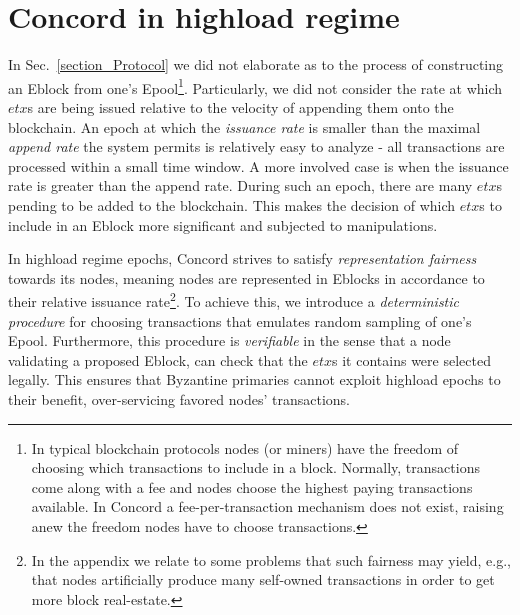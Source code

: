 \section{Concord in highload regime}
In Sec.~\ref{section_Protocol} we did not elaborate as to the process of constructing an Eblock from one's Epool\footnote{In typical blockchain protocols nodes (or miners) have the freedom of choosing which transactions to include in a block. Normally, transactions come along with a fee and nodes choose the highest paying transactions available. In Concord a fee-per-transaction mechanism does not exist, raising anew the freedom nodes have to choose transactions.}. Particularly, we did not consider the rate at which $etx$s are being issued relative to the velocity of appending them onto the blockchain. An epoch at which the \emph{issuance rate} is smaller than the maximal \emph{append rate} the system permits is relatively easy to analyze - all transactions are processed within a small time window. A more involved case is when the issuance rate is greater than the append rate. During such an epoch, there are many $etx$s pending to be added to the blockchain. This makes the decision of which $etx$s to include in an Eblock more significant and subjected to manipulations.

In highload regime epochs, Concord strives to satisfy \emph{representation fairness} towards its nodes, meaning nodes are represented in Eblocks in accordance to their relative issuance rate\footnote{In the appendix we relate to some problems that such fairness may yield, e.g., that nodes artificially produce many self-owned transactions in order to get more block real-estate.}. To achieve this, we introduce a \emph{deterministic procedure} for choosing transactions that emulates random sampling of one's Epool. Furthermore, this procedure is \emph{verifiable} in the sense that a node validating a proposed Eblock, can check that the $etx$s it contains were selected legally. This ensures that Byzantine primaries cannot exploit highload epochs to their benefit, over-servicing favored nodes' transactions.

